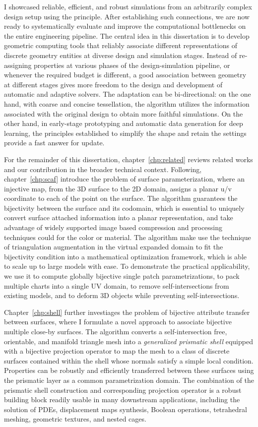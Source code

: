 I showcased reliable, efficient, and robust simulations from an arbitrarily complex design setup using the principle. After establishing such connections, we are now ready to systematically evaluate and improve the computational bottlenecks on the entire engineering pipeline.
The central idea in this dissertation is to develop geometric computing tools that reliably associate different representations of discrete geometry entities at diverse design and simulation stages. 
Instead of re-assigning properties at various phases of the design-simulation pipeline, or whenever the required budget is different, a good association between geometry at different stages gives more freedom to the design and development of automatic and adaptive solvers. The adaptation can be bi-directional: on the one hand, with coarse and concise tessellation, the algorithm utilizes the information associated with the original design to obtain more faithful simulations. On the other hand, in early-stage prototyping and automatic data generation for deep learning, the principles established to simplify the shape and retain the settings provide a fast answer for update. 

For the remainder of this dissertation, chapter~\ref*{chp:related} reviews related works and our contribution in the broader technical context. 
Following, chapter~\ref*{chp:scaf} introduce the problem of surface parameterization, where an injective map, from the 3D surface to the 2D domain, assigns a planar u/v coordinate to each of the point on the surface. The algorithm guarantees the bijectivity between the surface and its codomain, which is essential to uniquely convert surface attached information into a planar representation, and take advantage of widely supported image based compression and processing techniques could for the color or material. 
The algorithm make use the technique of triangulation augmentation in the virtual expanded domain to fit the bijectivity condition into a mathematical optimization framework, which is able to scale up to large models with ease. 
To demonstrate the practical applicability, we use it to compute globally bijective single patch parametrizations, to pack multiple charts into a single UV domain, to remove self-intersections from existing models, and to deform 3D objects while preventing self-intersections.

Chapter~\ref*{chp:shell} further investiages the problem of bijective attribute transfer between surfaces, where I formulate a novel approach to associate bijective multiple close-by surfaces. The algorithm converts a self-intersection free, orientable, and manifold triangle mesh into a \emph{generalized prismatic shell} equipped with a bijective projection operator to map the mesh to a class of discrete surfaces contained within the shell whose normals satisfy a simple local condition. 
Properties can be robustly and efficiently transferred between these surfaces using the prismatic layer as a common parametrization domain. 
The combination of the prismatic shell construction and corresponding projection operator is a robust building block readily usable in many downstream applications, including the solution of PDEs, displacement maps synthesis, Boolean operations, tetrahedral meshing, geometric textures, and nested cages.

